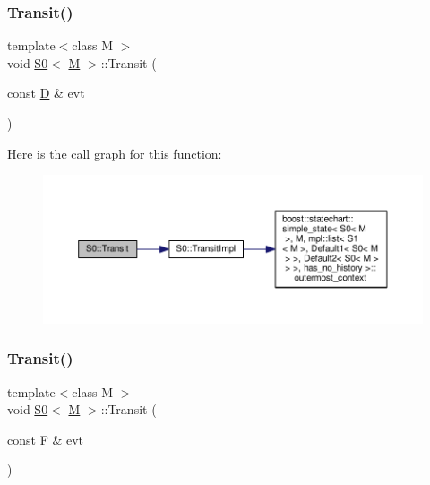 \subsubsection{\texorpdfstring{Transit()}{Transit()}\hspace{0.1cm}{\footnotesize\ttfamily [4/7]}}
{\footnotesize\ttfamily template$<$class M $>$ \\
void \mbox{\hyperlink{struct_s0}{S0}}$<$ \mbox{\hyperlink{struct_m}{M}} $>$\+::Transit (\begin{DoxyParamCaption}\item[{const \mbox{\hyperlink{struct_d}{D}} \&}]{evt }\end{DoxyParamCaption})\hspace{0.3cm}{\ttfamily [inline]}}

Here is the call graph for this function\+:
\nopagebreak
\begin{figure}[H]
\begin{center}
\leavevmode
\includegraphics[width=350pt]{struct_s0_a4fd4a4f8f2d4eed1d293bf74d09e145c_cgraph}
\end{center}
\end{figure}
\mbox{\label{struct_s0_a6b0101df75c95bf575fd3292008a490f}} 
\subsubsection{\texorpdfstring{Transit()}{Transit()}\hspace{0.1cm}{\footnotesize\ttfamily [5/7]}}
{\footnotesize\ttfamily template$<$class M $>$ \\
void \mbox{\hyperlink{struct_s0}{S0}}$<$ \mbox{\hyperlink{struct_m}{M}} $>$\+::Transit (\begin{DoxyParamCaption}\item[{const \mbox{\hyperlink{struct_f}{F}} \&}]{evt }\end{DoxyParamCaption})\hspace{0.3cm}{\ttfamily [inline]}}

